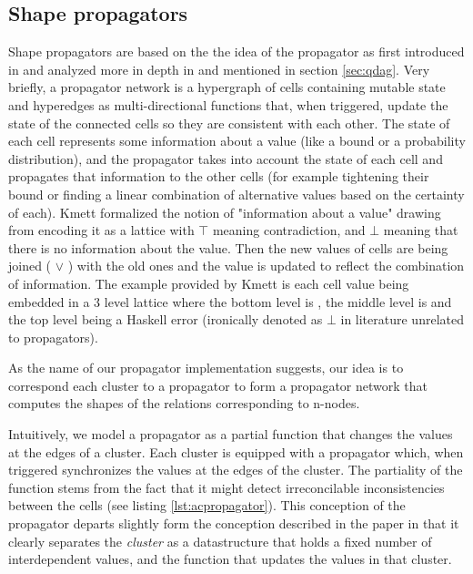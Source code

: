 \subsection{Shape propagators}
\label{sec:shape_propagators}

Shape propagators are based on the the idea of the propagator as first
introduced in \cite{sussmanArtPropagator2009} and analyzed more in
depth in \cite{hansonSoftwareDesignFlexibility2021a} and mentioned in
section \ref{sec:qdag}. Very briefly, a propagator network is a
hypergraph of cells containing mutable state and hyperedges as
multi-directional functions that, when triggered, update the state of
the connected cells so they are consistent with each other. The state
of each cell represents some information about a value (like a bound
or a probability distribution), and the propagator takes into account
the state of each cell and propagates that information to the other
cells (for example tightening their bound or finding a linear
combination of alternative values based on the certainty of
each). Kmett \cite{kmettPropagators2021} formalized the notion of
"information about a value" drawing from
\cite{kuperLVarsLatticebasedData2013} encoding it as a lattice with
\(\top\) meaning contradiction, and \(\bot\) meaning that there is no
information about the value. Then the new values of cells are being
joined ( \(\lor\) ) with the old ones and the value is updated to
reflect the combination of information. The example provided by Kmett
is each cell value being embedded in a 3 level lattice where the
bottom level is , the middle level is  and
the top level being a Haskell error (ironically denoted as \(\bot\) in
literature unrelated to propagators).

As the name of our propagator implementation suggests, our idea is to
correspond each cluster to a propagator to form a propagator network
that computes the shapes of the relations corresponding to n-nodes.

Intuitively, we model a propagator as a partial function that changes
the values at the edges of a cluster. Each cluster is equipped with a
propagator which, when triggered synchronizes the values at the edges
of the cluster. The partiality of the function stems from the fact
that it might detect irreconcilable inconsistencies between the cells
(see listing \ref{lst:acpropagator}). This conception of the
propagator departs slightly form the conception described in the paper
in that it clearly separates the \emph{cluster} as a datastructure
that holds a fixed number of interdependent values, and the function
that updates the values in that cluster.

